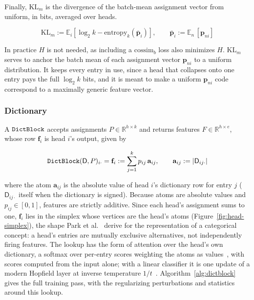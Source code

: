Finally, $\mathrm{KL}_m$ is the divergence of the batch-mean assignment
vector from uniform, in bits, averaged over heads.

\begin{equation}
	\mathrm{KL}_m := \mathbb{E}_{i}\!\left[\log_2 k -
	\mathrm{entropy}_k\!\left(\bar{\mathbf{p}}_i\right)\right],
	\qquad
	\bar{\mathbf{p}}_i := \mathbb{E}_{n}\,[\mathbf{p}_{ni}]
	\label{eq:KL}
\end{equation}

In practice $H$ is not needed, as including a
$\mathrm{cossim}_b$ loss also minimizes $H$.
$\mathrm{KL}_m$ serves to anchor the batch mean of each assignment vector
$\mathbf{p}_{ni}$ to a uniform distribution.
It keeps every entry in use, since a head that collapses onto one entry
pays the full $\log_2 k$ bits, and it is meant to make a uniform
$\mathbf{p}_{ni}$ code correspond to a maximally generic feature vector.

\subsubsection{Dictionary}
\label{sec:dict}
A $\mathop{\mathtt{DictBlock}}\limits$ accepts assignments
$P \in \mathbb{R}^{h \times k}$
and returns features $F \in \mathbb{R}^{h \times e}$, whose row
$\mathbf{f}_i$ is head $i$'s output, given by

\begin{equation}
	\mathop{\mathtt{DictBlock}}\limits(\mathsf{D},P)_{i\cdot} = \mathbf{f}_i :=
	\sum^{k}_{j=1} p_{ij}\,\mathbf{a}_{ij},
	\qquad
	\mathbf{a}_{ij} := \lvert \mathsf{D}_{ij\cdot}\rvert
	\label{eq:dictblock}
\end{equation}

where the atom $\mathbf{a}_{ij}$ is the absolute value of head $i$'s
dictionary row for entry $j$ ($\mathsf{D}_{ij\cdot}$ itself when the
dictionary is signed). Because atoms are absolute values
and $p_{ij} \in [0,1]$, features are strictly additive. Since each head's
assignment sums to one, $\mathbf{f}_i$ lies in the simplex whose vertices
are the head's atoms (Figure~\ref{fig:head-simplex}), the shape Park et
al.~\cite{park2025} derive for the representation of a categorical
concept: a head's entries are mutually exclusive alternatives, not
independently firing features. The lookup has the form of attention over
the head's own dictionary, a softmax over per-entry scores weighting the
atoms as values~\cite{bahdanau2015,luong2015,vaswani2017}, with scores
computed from the input alone; with a linear classifier it is one update
of a modern Hopfield layer at inverse temperature $1/t$~\cite{ramsauer2021}.
Algorithm~\ref{alg:dictblock} gives the full training pass, with the
regularizing perturbations and statistics around this lookup.

